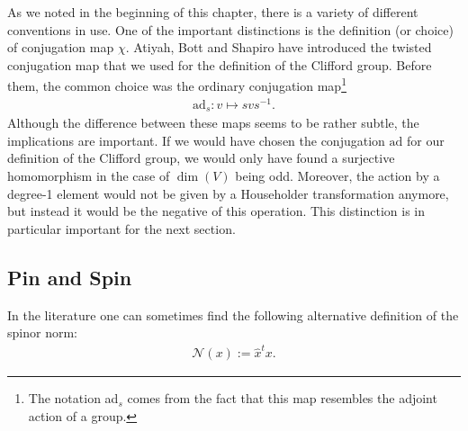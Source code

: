     \begin{remark}
        As we noted in the beginning of this chapter, there is a variety of different conventions in use. One of the important distinctions is the definition (or choice) of conjugation map $\chi$. Atiyah, Bott and Shapiro have introduced the twisted conjugation map that we used for the definition of the Clifford group. Before them, the common choice was the ordinary conjugation map\footnote{The notation ad$_s$ comes from the fact that this map resembles the adjoint action of a group.}
        \begin{gather}
            \text{ad}_s:v\mapsto svs^{-1}.
        \end{gather}
        Although the difference between these maps seems to be rather subtle, the implications are important. If we would have chosen the conjugation $\text{ad}$ for our definition of the Clifford group, we would only have found a surjective homomorphism in the case of $\dim(V)$ being odd. Moreover, the action by a degree-1 element would not be given by a Householder transformation anymore, but instead it would be the negative of this operation. This distinction is in particular important for the next section.
    \end{remark}

\subsection{Pin and Spin}\label{clifford:section:spin}

    \begin{remark}
        In the literature one can sometimes find the following alternative definition of the spinor norm:
        \begin{gather}
            \mathcal{N}(x) := \hat{x}^tx.
        \end{gather}
    \end{remark}

